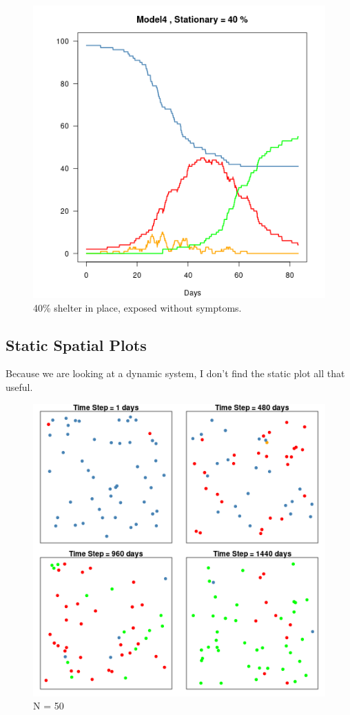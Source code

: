 \documentclass{article}\usepackage[]{graphicx}\usepackage[]{color}
\begin{document}
\begin{figure}
\includegraphics[width=1\textwidth]{Model4.png}
\caption{40\% shelter in place, exposed without symptoms.}
\end{figure}

\subsection{Static Spatial Plots}

Because we are looking at a dynamic system, I don't find the static plot all that useful.



\begin{figure}
\includegraphics[width=1\textwidth]{SSModel1.png}
\caption{N = 50}
\end{figure}
\end{document}
